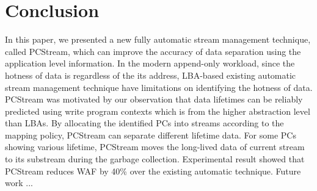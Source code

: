 \section{Conclusion}
In this paper, we presented a new fully automatic stream management technique,
called PCStream, which can improve the accuracy of data separation
using the application level information.
In the modern append-only workload, since the hotness of data is regardless of 
the its address, 
LBA-based existing automatic stream management technique have limitations on 
identifying the hotness of data.
PCStream was motivated by our observation that data lifetimes can be
reliably predicted using write program contexts which is from the higher
abstraction level than LBAs.
By allocating the identified PCs into streams according to the mapping policy,
PCStream can separate different lifetime data. 
For some PCs showing various lifetime, PCStream moves the long-lived data of 
current stream to its substream during the garbage collection.
Experimental result showed that PCStream reduces WAF by 40\% over the existing
automatic technique.
Future work ...
